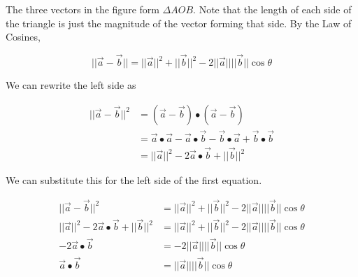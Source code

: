 \documentclass{article}
\begin{document}
            \noindent The three vectors in the figure form $\Delta AOB$. Note that the length of
            each side of the triangle is just the magnitude of the vector forming that side.
            By the Law of Cosines,

            \begin{equation*}
                ||\overrightarrow{a}-\overrightarrow{b}||
                =||\overrightarrow{a}||^2+||\overrightarrow{b}||^2-2||\overrightarrow{a}||||\overrightarrow{b}
                ||\cos{\theta}
            \end{equation*}

            \pagebreak
            \noindent We can rewrite the left side as

            \begin{align*}
                ||\overrightarrow{a}-\overrightarrow{b}||^2 &
                = (\overrightarrow{a}-\overrightarrow{b})\bullet(\overrightarrow{a}-\overrightarrow{b})\\
                &= \overrightarrow{a}\bullet\overrightarrow{a}
                -\overrightarrow{a}\bullet\overrightarrow{b}-\overrightarrow{b}\bullet\overrightarrow{a}
                +\overrightarrow{b}\bullet\overrightarrow{b}\\
                &= ||\overrightarrow{a}||^2-2\overrightarrow{a}\bullet\overrightarrow{b}+||\overrightarrow{b}||^2
            \end{align*}

            \noindent We can substitute this for the left side of the first equation.

            \begin{align*}
                ||\overrightarrow{a}-\overrightarrow{b}||^2
                &= ||\overrightarrow{a}||^2+||\overrightarrow{b}||^2-2||\overrightarrow{a}
                ||||\overrightarrow{b}||\cos{\theta}\\
                ||\overrightarrow{a}||^2-2\overrightarrow{a}\bullet\overrightarrow{b}
                +||\overrightarrow{b}||^2 &= ||\overrightarrow{a}||^2+||\overrightarrow{b}||^2-2
                ||\overrightarrow{a}||||\overrightarrow{b}||\cos{\theta}\\
                -2\overrightarrow{a}\bullet\overrightarrow{b} &= -2||\overrightarrow{a}||||\overrightarrow{b}
                ||\cos{\theta}\\\overrightarrow{a}\bullet\overrightarrow{b} &= ||\overrightarrow{a}
                ||||\overrightarrow{b}||\cos{\theta}
            \end{align*}
\end{document}

